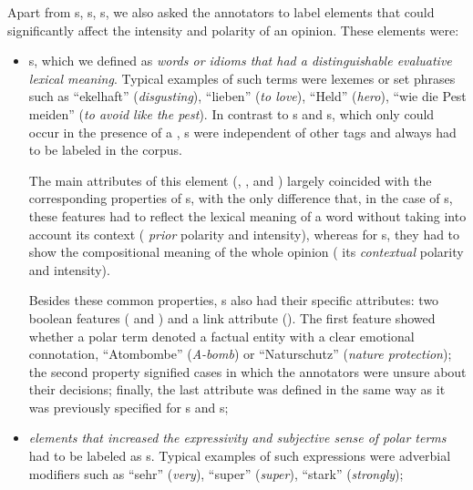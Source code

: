 Apart from s, s,
s, we also asked the annotators to label elements
that could significantly affect the intensity and polarity of an
opinion.  These elements were:

\begin{itemize}
\item
  \textbf{}s, which we defined as \emph{words or
    idioms that had a distinguishable evaluative lexical meaning}.
  Typical examples of such terms were lexemes or set phrases such as
  ``ekelhaft'' (\emph{disgusting}), ``lieben'' (\emph{to love}),
  ``Held'' (\emph{hero}), ``wie die Pest meiden'' (\emph{to avoid like
    the pest}).  In contrast to s and
  s, which only could occur in the presence of a
  , s were independent of
  other tags and always had to be labeled in the corpus.

  The main attributes of this element (,
  , and ) largely coincided
  with the corresponding properties of s, with the
  only difference that, in the case of s, these
  features had to reflect the lexical meaning of a word without taking
  into account its context (\ie{} \emph{prior} polarity and
  intensity), whereas for s, they had to show the
  compositional meaning of the whole opinion (\ie{} its
  \emph{contextual} polarity and intensity).

  Besides these common properties, s also had
  their specific attributes: two boolean features
  ( and ) and a link
  attribute ().  The first feature
  showed whether a polar term denoted a factual entity with a clear
  emotional connotation, \eg{} ``Atombombe'' (\emph{A-bomb}) or
  ``Naturschutz'' (\emph{nature protection}); the second property
  signified cases in which the annotators were unsure about their
  decisions; finally, the last attribute was defined in the same way
  as it was previously specified for s and
  s;

\item
  \emph{elements that increased the expressivity and subjective sense
    of polar terms} had to be labeled as
  \textbf{}s.  Typical examples of such
  expressions were adverbial modifiers such as ``sehr'' (\emph{very}),
  ``super'' (\emph{super}), ``stark'' (\emph{strongly});


\end{itemize}
